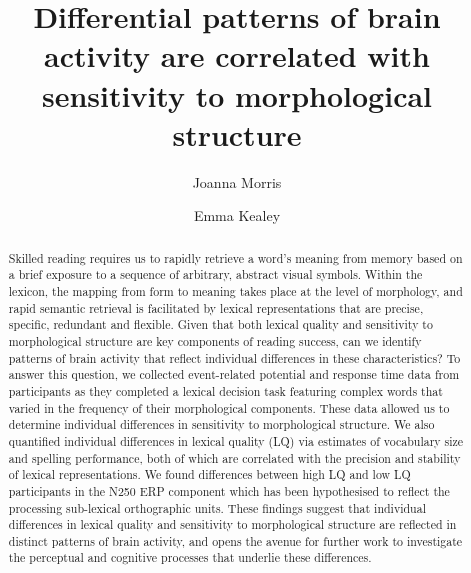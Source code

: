 \documentclass[review]{elsarticle}
\begin{document}
	
\begin{frontmatter}


\title{Differential patterns of brain activity are correlated with sensitivity to morphological structure}


\author[mymainaddress]{Joanna Morris}

\author[mymainaddress]{Emma Kealey}

\address[mymainaddress]{Department of Psychology, Providence College, Providence, RI, USA}


\begin{abstract}
Skilled reading requires us to rapidly retrieve a word's meaning from memory based on a brief exposure to a sequence of arbitrary, abstract visual symbols. Within the lexicon, the mapping from form to meaning takes place at the level of morphology, and rapid semantic retrieval is facilitated by lexical representations that are precise, specific, redundant and flexible. Given that both lexical quality and sensitivity to morphological structure are key components of reading success, can we identify patterns of brain activity that reflect individual differences in these characteristics? To answer this question, we collected event-related potential and response time data from participants as they completed a lexical decision task featuring complex words that varied in the frequency of their morphological components. These data allowed us to determine individual differences in sensitivity to morphological structure. We also quantified individual differences in lexical quality (LQ) via estimates of vocabulary size and spelling performance, both of which are correlated with the precision and stability of lexical representations. We found differences between high LQ and low LQ participants in the N250 ERP component which has been hypothesised to reflect the processing sub-lexical orthographic units. These findings suggest that individual differences in lexical quality and sensitivity to morphological structure are reflected in distinct patterns of brain activity, and opens the avenue for further work to investigate the perceptual and cognitive processes that underlie these differences.
\end{abstract}



\end{frontmatter}
\end{document}
